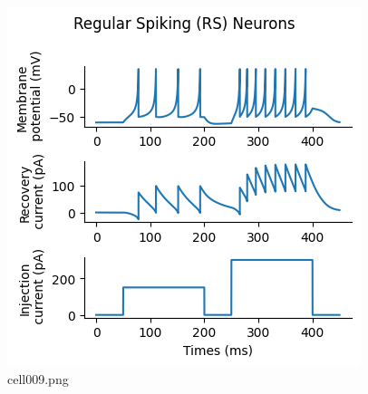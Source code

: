 \begin{figure}[ht]
	\centering
	\includegraphics[scale=0.8, max width=\linewidth]{./fig/neuron-model/izhikevich/cell009.png}
	\caption{cell009.png}
	\label{cell009.png}
\end{figure}
